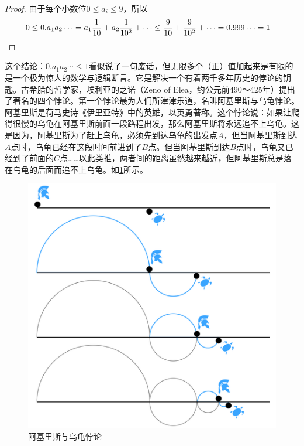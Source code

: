\documentclass[b5paper]{ctexart}
\begin{document}
\begin{proof}
  由于每个小数位$0 \leq a_i \leq 9$，所以
  \begin{align*}
0 \leq 0.a_1 a_2 \cdots = a_1\frac{1}{10} + a_2\frac{1}{10^2} + \cdots \leq \frac{9}{10} + \frac{9}{10^2} + \cdots = 0.999\cdots = 1 & \qedhere
  \end{align*}
\end{proof}

这个结论：$0.a_1a_2\cdots \leq 1$看似说了一句废话，但无限多个（正）值加起来是有限的是一个极为惊人的数学与逻辑断言。它是解决一个有着两千多年历史的悖论的钥匙。古希腊的哲学家，埃利亚的芝诺（Zeno of Elea，约公元前490～425年）提出了著名的四个悖论。第一个悖论最为人们所津津乐道，名叫阿基里斯与乌龟悖论。阿基里斯是荷马史诗《伊里亚特》中的英雄，以英勇著称。这个悖论说：如果让爬得很慢的乌龟在阿基里斯前面一段路程出发，那么阿基里斯将永远追不上乌龟。这是因为，阿基里斯为了赶上乌龟，必须先到达乌龟的出发点$A$，但当阿基里斯到达$A$点时，乌龟已经在这段时间前进到了$B$点。但当阿基里斯到达$B$点时，乌龟又已经到了前面的$C$点……以此类推，两者间的距离虽然越来越近，但阿基里斯总是落在乌龟的后面而追不上乌龟。如\cref{fig:Achilles-paradox}所示。

\begin{figure}[htbp]
 \centering
 \includegraphics[scale=0.4]{img/achilles-paradox}
 \caption{阿基里斯与乌龟悖论}
 \label{fig:Achilles-paradox}
\end{figure}
\end{document}
